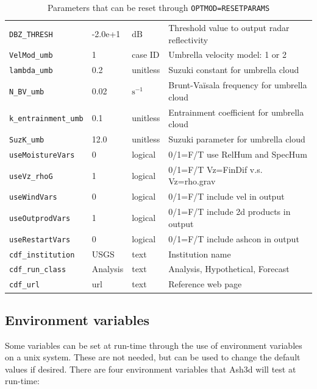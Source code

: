\begin{table}[htbp]
\begin{center}
\begin{tabular}{| l | l | l | l |}
\texttt{DBZ\_THRESH}       & -2.0e+1  & $\mathrm{dB}$      &  Threshold value to output radar reflectivity \\
\texttt{VelMod\_umb}       & 1        & case ID            &  Umbrella velocity model: 1 \cite{Costa14} or 2 \cite{Webster20} \\
\texttt{lambda\_umb}       & 0.2      & unitless           &  Suzuki constant for umbrella cloud \\
\texttt{N\_BV\_umb}        & 0.02     & $\mathrm{s^{-1}}$  &  Brunt-Va\"isala frequency for umbrella cloud \\
\texttt{k\_entrainment\_umb} & 0.1    & unitless           &  Entrainment coefficient for umbrella cloud \\
\texttt{SuzK\_umb}         & 12.0     & unitless           &  Suzuki parameter for umbrella cloud \\
\texttt{useMoistureVars}   & 0        & logical            &  0/1=F/T use RelHum and SpecHum \\
\texttt{useVz\_rhoG}       & 1        & logical            &  0/1=F/T Vz=FinDif v.s. Vz=rho.grav \\
\texttt{useWindVars}       & 0        & logical            &  0/1=F/T include vel in output \\
\texttt{useOutprodVars}    & 1        & logical            &  0/1=F/T include 2d products in output \\
\texttt{useRestartVars}    & 0        & logical            &  0/1=F/T include ashcon in output \\
\texttt{cdf\_institution}  & USGS     & text               &  Institution name \\
\texttt{cdf\_run\_class}   & Analysis & text               &  Analysis, Hypothetical, Forecast \\
\texttt{cdf\_url}          & url      & text               &  Reference web page \\
\hline
\end{tabular}
\caption{\label{tab:ResetParam}Parameters that can be reset through \texttt{OPTMOD=RESETPARAMS}}
\end{center}
\end{table}
\normalsize

\subsection{Environment variables}
Some variables can be set at run-time through the use of environment variables on a unix
system. These are not needed, but can be used to change the default values if desired.
There are four environment variables that Ash3d will test at run-time:


